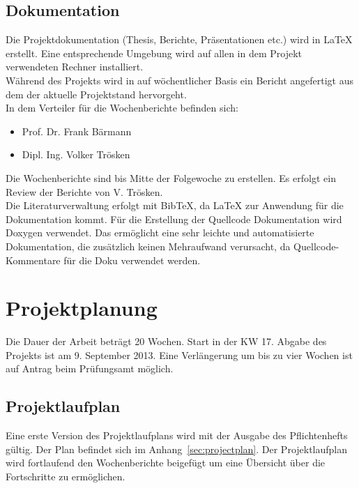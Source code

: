 \documentclass[a4paper,12pt,fleqn]{article}
\begin{document}
\subsection{Dokumentation}
Die Projektdokumentation (Thesis, Berichte, Präsentationen etc.) wird in \LaTeX{} erstellt. Eine entsprechende Umgebung wird auf allen in dem Projekt verwendeten Rechner installiert.\\
Während des Projekts wird in auf wöchentlicher Basis ein Bericht angefertigt aus dem der aktuelle Projektstand hervorgeht.\\
In dem Verteiler für die Wochenberichte befinden sich:
\begin{itemize}
\item Prof. Dr. Frank Bärmann
\item Dipl. Ing. Volker Trösken
\end{itemize}
Die Wochenberichte sind bis Mitte der Folgewoche zu erstellen. Es erfolgt ein Review der Berichte von V. Trösken.\\
Die Literaturverwaltung erfolgt mit BibTeX, da \LaTeX{} zur Anwendung für die Dokumentation kommt.
Für die Erstellung der Quellcode Dokumentation wird Doxygen \cite{Dox1} verwendet. Das ermöglicht eine sehr leichte und automatisierte Dokumentation, die zusätzlich keinen Mehraufwand verursacht, da Quellcode-Kommentare für die Doku verwendet werden.\\

\section{Projektplanung}
Die Dauer der Arbeit beträgt 20 Wochen. Start in der KW 17. Abgabe des Projekts ist am 9. September 2013. Eine Verlängerung um bis zu vier Wochen ist auf Antrag beim Prüfungsamt möglich.
\subsection{Projektlaufplan}
Eine erste Version des Projektlaufplans wird mit der Ausgabe des Pflichtenhefts gültig. Der Plan befindet sich im Anhang~\ref{sec:projectplan}. Der Projektlaufplan wird fortlaufend den Wochenberichte beigefügt um eine Übersicht über die Fortschritte zu ermöglichen.



\newpage


\end{document}
